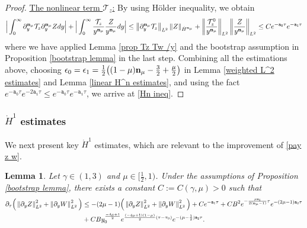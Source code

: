 \documentclass{article}
\newcommand{\norm}[1]{\left\lVert#1\right\rVert}
\newcommand{\ga}{\gamma}
\newcommand{\pa}{\partial}
\def\espz{Z}
\def\espw{W}
\def\nmz{\mathcal T_z}
\def\epone{\mathtt{a_1}}
\def\eptwo{\mathtt{a_2}}
\def\epzero{\mathtt{a_0}}
\def\ndmu{{\bf{n}_{\mu}}}
\numberwithin{equation}{section}
\newtheorem{lemma}[theorem]{Lemma}
\begin{document}
\begin{proof}
 
 	\noindent\underline{The nonlinear term $\nmz$:} By using H\"{o}lder inequality, we obtain
	\begin{align*}
		\Big| \int_0^\infty \pa_y^\ndmu\nmz\pa_y^\ndmu \espz dy\Big|+\Big|\int_0^\infty \frac{\nmz}{y^{\ndmu}} \frac{\espz}{y^{\ndmu}} dy \Big|
		\le \norm{\pa_y^\ndmu \nmz}_{L^2} \norm{\espz}_{\dot H^\ndmu}+\norm{\frac{\nmz^0}{y^{\ndmu}}}_{L^2} \norm{\frac{\espz}{y^{\ndmu}}}_{L^2}
        \leq C e^{-\epzero \tau} e^{-\epone \tau}
	\end{align*}
    where we have applied Lemma \ref{prop Tz Tw /y} and the bootstrap assumption in Proposition \ref{bootstrap lemma} in the last step. 
   Combining all the estimations above, choosing $\epsilon_0=\epsilon_1=\frac{1}{2}\big((1-\mu)\ndmu - \frac32 + \frac{\mu}{2} \big)$ in Lemma \ref{weighted L^2 estimates} and Lemma \ref{linear H^n estimates}, and using the fact $e^{-\epzero \tau}e^{-2\epone \tau} \leq e^{-\epzero \tau}e^{-\epone \tau}$, we arrive at \eqref{Hn ineq}.
\end{proof}



\subsubsection{$\dot H^1 $ estimates}
We next present key $\dot H^1$ estimates, which are relevant to the improvement of \eqref{pay z w}. 

\begin{lemma}\label{lemma nonlinear H^1}
	 Let $\ga\in(1,3)$ and $\mu\in[\frac12,1)$. Under the assumptions of Proposition \ref{bootstrap lemma}, there exists a constant $C:=C(\ga,\mu)>0$ such that
	\begin{align*}
    \pa_\tau\Big(\norm{\pa_y\espz}_{L^2}^2+\norm{\pa_y\espw}_{L^2}^2\Big)
			&\leq  -(2\mu-1 ) \Big(\norm{\pa_y \espz}_{L^2}^2 +\norm{\pa_y \espw}_{L^2} ^2\Big) + C   e^{-\epone \tau} + CB^2 e^{-\frac{\mu\epone}{2(\ndmu-1)} \tau }e^{-(2\mu-1)\eptwo \tau} \\
          &+CB y_0^{\frac{-4\mu +1}{2}} 
            e^{\frac{(-4\mu+1)(1-\mu)}{2}(\tau-\tau_0)}e^{-(\mu-\frac12)\eptwo\tau}.
		 \end{align*}
\end{lemma}
\end{document}
